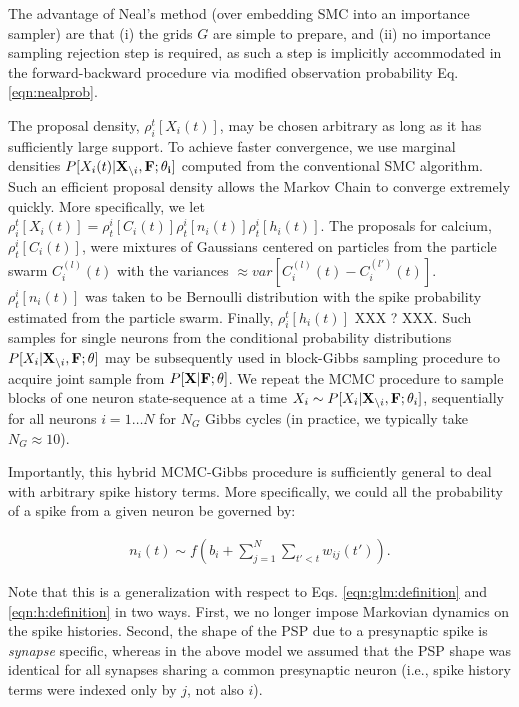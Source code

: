 The advantage of Neal's method (over embedding SMC into an importance sampler) are that (i) the grids $G$ are simple to prepare, and (ii) no importance sampling rejection step is required, as such a  step is implicitly accommodated in the forward-backward procedure via modified observation probability Eq. \eqref{eqn:nealprob}.

The proposal density, $\rho_i^t[X_i(t)]$, may be chosen arbitrary as long as it has sufficiently large support.  To achieve faster convergence, we use marginal densities $P[X_i(t)|{\bf X}_{\backslash i}, \bf F; \mathbf{\theta}_i]$ computed from the conventional SMC algorithm. Such an efficient proposal density allows the Markov Chain to converge extremely quickly.  More specifically, we let $\rho_i^t[X_i(t)] = \rho^i_t[C_i(t)] \rho^i_t[n_i(t)] \rho^i_t[h_i(t)].$  The proposals for calcium, $\rho^i_t[C_i(t)]$, were mixtures of Gaussians centered on particles from the particle swarm $C_i^{(l)}(t)$ with the variances $\approx var\left[C_i^{(l)}(t)-C_i^{(l')}(t) \right]$. $\rho^i_t[n_i(t)]$ was taken to be Bernoulli distribution with the spike probability estimated from the particle swarm. Finally, $\rho_i^t[h_i(t)]$ XXX ? XXX.  Such samples for single neurons from the conditional probability distributions $P[X_i|{\bf X}_{\backslash i}, \bf F; \theta]$ may be subsequently used in block-Gibbs sampling procedure to acquire joint sample from $P[{\bf X}| {\bf F}; \theta]$.  We repeat the MCMC procedure to sample blocks of one neuron state-sequence at a time $X_i\sim P[X_{i}|{\bf X}_{\backslash i},{\bf F}; \mathbf{\theta}_i]$, sequentially for all neurons $i=1\ldots N$ for $N_G$ Gibbs cycles (in practice, we typically take $N_G \approx 10$).

Importantly, this hybrid MCMC-Gibbs procedure is sufficiently general to deal with arbitrary spike history terms.  More specifically, we could all the probability of a spike from a given neuron be governed by:

\begin{align}
n_i(t) \sim f(b_i+\sum_{j=1}^{N}\sum_{t'<t} w_{ij}(t')).
\end{align}

\noindent Note that this is a generalization with respect to Eqs. \eqref{eqn:glm:definition} and \eqref{eqn:h:definition} in two ways.  First, we no longer impose Markovian dynamics on the spike histories.  Second, the shape of the PSP due to a presynaptic spike is \emph{synapse} specific, whereas in the above model we assumed that the PSP shape was identical for all synapses sharing a common presynaptic neuron (i.e., spike history terms were indexed only by $j$, not also $i$).  

